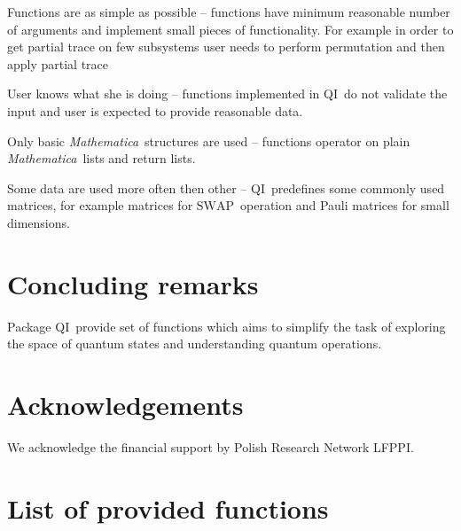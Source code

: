 \documentclass[a4paper,11pt]{elsart}
\newcommand{\Mathematica}{\emph{Mathematica}}
\newcommand{\1}{{\rm 1\hspace{-0.9mm}l}}
\newcommand{\SWAP}{\ensuremath{\mathrm{SWAP}}}
\newcommand{\qi}{QI}
\begin{document}
\begin{list}{\textbf{P}}{}
\item Functions are as simple as possible -- functions have minimum reasonable
number of arguments and implement small pieces of functionality. For example in
order to get partial trace on few subsystems user needs to perform permutation
and then apply partial trace 
\item User knows what she is doing -- functions implemented in \qi\ do not
validate the input and user is expected to provide reasonable data.
\item Only basic \Mathematica\ structures are used -- functions operator on
plain \Mathematica\ lists and return lists.
\item Some data are used more often then other -- \qi\ predefines some commonly
used matrices, for example matrices for \SWAP\ operation and Pauli matrices for
small dimensions.
\end{list}

\section{Concluding remarks}\label{sec:comclude}
Package \qi\ provide set of functions which aims to simplify the task of
exploring the space of quantum states and understanding quantum operations.

\section*{Acknowledgements}
We acknowledge the financial support by Polish Research Network LFPPI.

\appendix
\section{List of provided functions}

%



\end{document}
